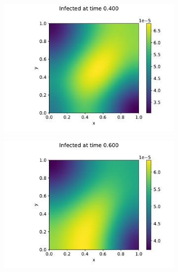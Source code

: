 \begin{figure}
\begin{subfigure}[b]{0.49\linewidth}
        \includegraphics[width=\textwidth]{report/Images/plots/plot-i_t=4000-1.pdf}
    \end{subfigure}
    \hfill
    \begin{subfigure}[b]{0.49\linewidth}
        \centering
        \includegraphics[width=\textwidth]{report/Images/plots/plot-i_t=6000-1.pdf}
    \end{subfigure}
    \hfill
    \begin{subfigure}[b]{0.49\linewidth}
        \centering

\end{subfigure}
\end{figure}
